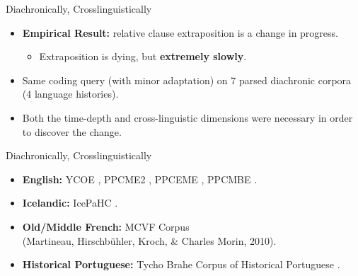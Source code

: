 \documentclass[hyperref={pdfpagelabels=false}]{beamer}
\begin{document}
\begin{frame}{Diachronically, Crosslinguistically}
\begin{itemize}

    \item \textbf{Empirical Result:} relative clause extraposition is a change in progress.
        \begin{itemize}
        \item Extraposition is dying, but \textbf{extremely slowly}.
        \end{itemize}
    \item Same coding query (with minor adaptation) on 7 parsed diachronic corpora (4 language histories).
    \item Both the time-depth and cross-linguistic dimensions were necessary in order to discover the change.
    \end{itemize}
\end{frame}








\begin{frame}{Diachronically, Crosslinguistically}
\begin{itemize}
	\item \textbf{English:} YCOE \citep{ycoe}, PPCME2 \citep{ppcme2}, PPCEME \citep{ppceme}, PPCMBE \citep{ppcmbe}.
	\item \textbf{Icelandic:} IcePaHC \citep{icepahc09}.
	\item \textbf{Old/Middle French:} MCVF Corpus \\(Martineau, Hirschbühler, Kroch, \& Charles Morin, 2010)\nocite{mcvf}.
	\item \textbf{Historical Portuguese:} Tycho Brahe Corpus of Historical Portuguese \citep{tychobrahe}.
	\end{itemize}

\end{frame}
\end{document}
